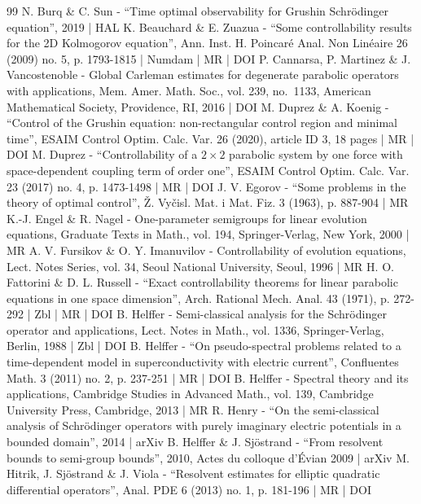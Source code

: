 \documentclass[10pt]{amsart}
\theoremstyle{plain}
\theoremstyle{definition}
\newcommand{\1}{\mathds 1}
\begin{document}
\begin{thebibliography}{99}
N. Burq \& C. Sun - “Time optimal observability for Grushin Schrödinger equation”, 2019 | HAL
K. Beauchard \& E. Zuazua - “Some controllability results for the 2D Kolmogorov equation”, Ann. Inst. H. Poincaré Anal. Non Linéaire 26 (2009) no. 5, p. 1793-1815 | Numdam | MR | DOI
P. Cannarsa, P. Martinez \& J. Vancostenoble - Global Carleman estimates for degenerate parabolic operators with applications, Mem. Amer. Math. Soc., vol. 239, no. 1133, American Mathematical Society, Providence, RI, 2016 | DOI
M. Duprez \& A. Koenig - “Control of the Grushin equation: non-rectangular control region and minimal time”, ESAIM Control Optim. Calc. Var. 26 (2020), article ID 3, 18 pages | MR | DOI
M. Duprez - “Controllability of a $2\times 2$ parabolic system by one force with space-dependent coupling term of order one”, ESAIM Control Optim. Calc. Var. 23 (2017) no. 4, p. 1473-1498 | MR | DOI
J. V. Egorov - “Some problems in the theory of optimal control”, Ž. Vyčisl. Mat. i Mat. Fiz. 3 (1963), p. 887-904 | MR
K.-J. Engel \& R. Nagel - One-parameter semigroups for linear evolution equations, Graduate Texts in Math., vol. 194, Springer-Verlag, New York, 2000 | MR
A. V. Fursikov \& O. Y. Imanuvilov - Controllability of evolution equations, Lect. Notes Series, vol. 34, Seoul National University, Seoul, 1996 | MR
H. O. Fattorini \& D. L. Russell - “Exact controllability theorems for linear parabolic equations in one space dimension”, Arch. Rational Mech. Anal. 43 (1971), p. 272-292 | Zbl | MR | DOI
B. Helffer - Semi-classical analysis for the Schrödinger operator and applications, Lect. Notes in Math., vol. 1336, Springer-Verlag, Berlin, 1988 | Zbl | DOI
B. Helffer - “On pseudo-spectral problems related to a time-dependent model in superconductivity with electric current”, Confluentes Math. 3 (2011) no. 2, p. 237-251 | MR | DOI
B. Helffer - Spectral theory and its applications, Cambridge Studies in Advanced Math., vol. 139, Cambridge University Press, Cambridge, 2013 | MR
R. Henry - “On the semi-classical analysis of Schrödinger operators with purely imaginary electric potentials in a bounded domain”, 2014 | arXiv
B. Helffer \& J. Sjöstrand - “From resolvent bounds to semi-group bounds”, 2010, Actes du colloque d’Évian 2009 | arXiv
M. Hitrik, J. Sjöstrand \& J. Viola - “Resolvent estimates for elliptic quadratic differential operators”, Anal. PDE 6 (2013) no. 1, p. 181-196 | MR | DOI

\end{thebibliography}
\end{document}
